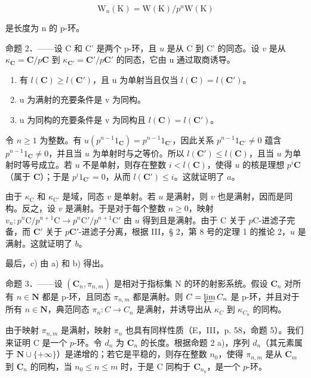 \[
\mathrm{W} _ {n} (\mathrm{K}) = \mathrm{W} (\mathrm{K}) / p ^ {n} \mathrm{W} (\mathrm{K})
\]

是长度为 n 的 p-环。

命题 2．——设 C 和 C' 是两个 p-环，且 \(u\) 是从 C 到 C' 的同态。设 \(v\) 是从 \(\kappa_{\mathbf{C}} = \mathbf{C} / p\mathbf{C}\) 到 \(\kappa_{\mathbf{C}'} = \mathbf{C}' / p\mathbf{C}'\) 的同态，它由 u 通过取商诱导。

\begin{enumerate}
\def\labelenumi{\alph{enumi})}
\item
  有 \(l(\mathbf{C}) \geqslant l(\mathbf{C}')\)，且 u 为单射当且仅当 \(l(\mathbf{C}) = l(\mathbf{C}')\)。
\item
  u 为满射的充要条件是 v 为同构。
\item
  u 为同构的充要条件是 v 为同构且 \(l(\mathbf{C}) = l(\mathbf{C}')\)。
\end{enumerate}

令 \(n \geqslant 1\) 为整数。有 \(u(p^{n-1}1_{\mathbf{C}}) = p^{n-1}1_{\mathbf{C}'}\)，因此关系 \(p^{n-1}1_{\mathbf{C}'} \neq 0\) 蕴含 \(p^{n-1}1_{\mathbf{C}} \neq 0\)，并且当 \(u\) 为单射时与之等价。所以 \(l(\mathbf{C}') \leqslant l(\mathbf{C})\)，且当 \(u\) 为单射时等号成立。若 \(u\) 不是单射，则存在整数 \(i < l(\mathbf{C})\)，使得 \(u\) 的核是理想 \(p^i\mathbf{C}\)（属于 \(\mathbf{C}\)）；于是 \(p^i1_{\mathbf{C}'} = 0\)，从而 \(l(\mathbf{C}') \leqslant i\)。这就证明了 \(a\)。

由于 \(\kappa_{\mathrm{C}}\) 和 \(\kappa_{\mathrm{C}'}\) 是域，同态 \(v\) 是单射。若 \(u\) 是满射，则 \(v\) 也是满射，因而是同构。反之，设 \(v\) 是满射。于是对于每个整数 \(n \geqslant 0\)，映射 \(v_{n}: p^{n}\mathrm{C}/p^{n+1}\mathrm{C} \to p^{n}\mathrm{C}'/p^{n+1}\mathrm{C}'\) 由 \(u\) 得到且是满射。由于 C 关于 \(p\mathrm{C}\)-进滤子完备，而 \(\mathbf{C}'\) 关于 \(p\mathbf{C}'\)-进滤子分离，根据 III，§ 2，第 8 号的定理 1 的推论 2，\(u\) 是满射。这就证明了 \(b\)。

最后，c) 由 a) 和 b) 得出。

命题 3．——设 \((\mathbf{C}_{n}, \pi_{n,m})\) 是相对于指标集 N 的环的射影系统。假设 \(\mathbf{C}_{n}\) 对所有 \(n \in \mathbf{N}\) 都是 p-环，且同态 \(\pi_{n,m}\) 都是满射。则 \(C = \varprojlim C_{n}\) 是 p-环，并且对于所有 \(n \in \mathbf{N}\)，典范同态 \(\pi_{n}: C \to C_{n}\) 是满射，并诱导出从 \(\kappa_{C}\) 到 \(\kappa_{C_{n}}\) 的同构。

由于映射 \(\pi_{n,m}\) 是满射，映射 \(\pi_n\) 也具有同样性质（E，III，p. 58，命题 5）。我们来证明 C 是一个 \(p\)-环。令 \(d_n\) 为 \(\mathbf{C}_n\) 的长度。根据命题 2 a)，序列 \(d_n\)（其元素属于 \(\mathbf{N} \cup \{+\infty\}\)）是递增的；若它是平稳的，则存在整数 \(n_0\)，使得 \(\pi_{n,m}\) 是从 \(\mathbf{C}_m\) 到 \(\mathbf{C}_n\) 的同构，当 \(n_0 \leqslant n \leqslant m\) 时，于是 C 同构于 \(\mathbf{C}_{n_0}\)，是一个 \(p\)-环。

